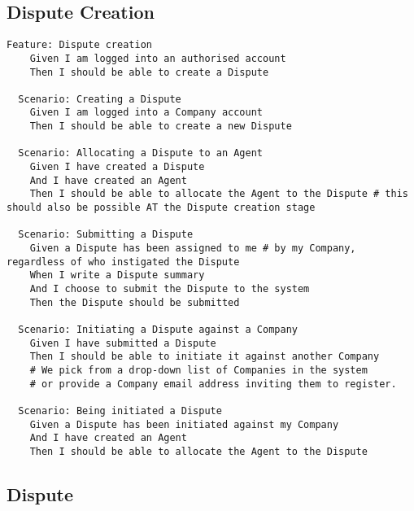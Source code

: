\subsection{Dispute Creation}

\begin{lstlisting}
Feature: Dispute creation
    Given I am logged into an authorised account
    Then I should be able to create a Dispute
    
  Scenario: Creating a Dispute
    Given I am logged into a Company account
    Then I should be able to create a new Dispute

  Scenario: Allocating a Dispute to an Agent
    Given I have created a Dispute
    And I have created an Agent
    Then I should be able to allocate the Agent to the Dispute # this should also be possible AT the Dispute creation stage

  Scenario: Submitting a Dispute
    Given a Dispute has been assigned to me # by my Company, regardless of who instigated the Dispute
    When I write a Dispute summary
    And I choose to submit the Dispute to the system
    Then the Dispute should be submitted

  Scenario: Initiating a Dispute against a Company
    Given I have submitted a Dispute
    Then I should be able to initiate it against another Company
    # We pick from a drop-down list of Companies in the system
    # or provide a Company email address inviting them to register.

  Scenario: Being initiated a Dispute
    Given a Dispute has been initiated against my Company
    And I have created an Agent
    Then I should be able to allocate the Agent to the Dispute
\end{lstlisting}

\subsection{Dispute}

